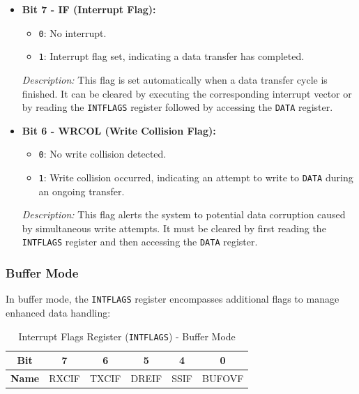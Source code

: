 \documentclass{article}
\begin{document}
\begin{itemize}
    \item \textbf{Bit 7 - IF (Interrupt Flag):} 
    \begin{itemize}
        \item \texttt{0}: No interrupt.
        \item \texttt{1}: Interrupt flag set, indicating a data transfer has completed.
    \end{itemize}
    \textit{Description:} This flag is set automatically when a data transfer cycle is finished. It can be cleared by executing the corresponding interrupt vector or by reading the \texttt{INTFLAGS} register followed by accessing the \texttt{DATA} register.
    
    \item \textbf{Bit 6 - WRCOL (Write Collision Flag):} 
    \begin{itemize}
        \item \texttt{0}: No write collision detected.
        \item \texttt{1}: Write collision occurred, indicating an attempt to write to \texttt{DATA} during an ongoing transfer.
    \end{itemize}
    \textit{Description:} This flag alerts the system to potential data corruption caused by simultaneous write attempts. It must be cleared by first reading the \texttt{INTFLAGS} register and then accessing the \texttt{DATA} register.
\end{itemize}

\subsubsection{Buffer Mode}
In buffer mode, the \texttt{INTFLAGS} register encompasses additional flags to manage enhanced data handling:

\begin{table}[H]
    \centering
    \caption{Interrupt Flags Register (\texttt{INTFLAGS}) - Buffer Mode}
    \begin{tabular}{@{}cccccc@{}}
        \toprule
        \textbf{Bit} & 7 & 6 & 5 & 4 & 0 \\ \midrule
        \textbf{Name} & RXCIF & TXCIF & DREIF & SSIF & BUFOVF \\ \bottomrule
    \end{tabular}
    \label{tab:intflags_buffer}
\end{table}
\end{document}
